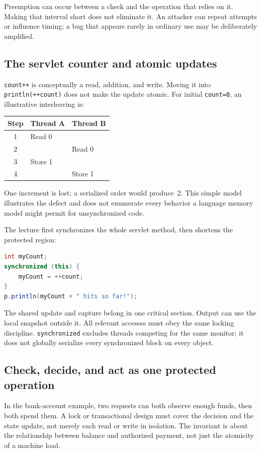 \documentclass[11pt,a4paper]{article}
\numberwithin{figure}{section}
\begin{document}
Preemption can occur between a check and the operation that relies on it. Making that interval short does not eliminate it. An attacker can repeat attempts or influence timing; a bug that appears rarely in ordinary use may be deliberately amplified.

\subsection{The servlet counter and atomic updates}
\texttt{count++} is conceptually a read, addition, and write. Moving it into \texttt{println(++count)} does not make the update atomic. For initial \texttt{count=0}, an illustrative interleaving is:
\begin{center}\begin{tabular}{@{}cll@{}}\toprule
Step & Thread A & Thread B\\\midrule
1 & Read 0 & \\
2 & & Read 0\\
3 & Store 1 & \\
4 & & Store 1\\\bottomrule
\end{tabular}\end{center}
One increment is lost; a serialized order would produce~2. This simple model illustrates the defect and does not enumerate every behavior a language memory model might permit for unsynchronized code.

The lecture first synchronizes the whole servlet method, then shortens the protected region:
\begin{lstlisting}[language=Java]
int myCount;
synchronized (this) {
    myCount = ++count;
}
p.println(myCount + " hits so far!");
\end{lstlisting}
The shared update and capture belong in one critical section. Output can use the local snapshot outside it. All relevant accesses must obey the same locking discipline. \texttt{synchronized} excludes threads competing for the same monitor; it does not globally serialize every synchronized block on every object.

\subsection{Check, decide, and act as one protected operation}
In the bank-account example, two requests can both observe enough funds, then both spend them. A lock or transactional design must cover the decision and the state update, not merely each read or write in isolation. The invariant is about the relationship between balance and authorized payment, not just the atomicity of a machine load.
\end{document}
